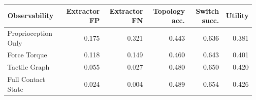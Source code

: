 \begin{tabular}{lrrrrr}
\toprule
Observability & Extractor FP & Extractor FN & Topology acc. & Switch succ. & Utility \\
\midrule
Proprioception Only & 0.175 & 0.321 & 0.443 & 0.636 & 0.381 \\
Force Torque & 0.118 & 0.149 & 0.460 & 0.643 & 0.401 \\
Tactile Graph & 0.055 & 0.027 & 0.480 & 0.650 & 0.420 \\
Full Contact State & 0.024 & 0.004 & 0.489 & 0.654 & 0.426 \\
\bottomrule
\end{tabular}
